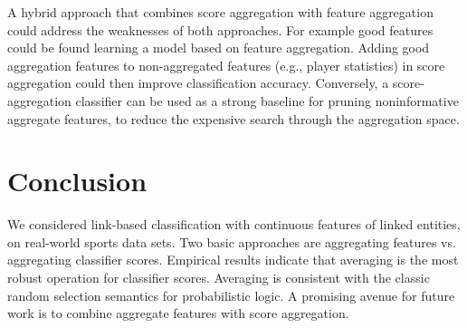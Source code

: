 \documentclass[oribibl]{llncs}%
\begin{document}
A hybrid approach that combines score aggregation with feature aggregation could address the weaknesses of both approaches. 
For example good features could be found learning a model based on feature aggregation. Adding  good aggregation features to non-aggregated features (e.g., player statistics) in score aggregation could then improve classification accuracy. Conversely, a score-aggregation classifier can be used as a strong baseline for pruning noninformative aggregate features, to reduce the expensive search through the aggregation space.


\section{Conclusion} We considered link-based classification with continuous features of linked entities, on real-world sports data sets. Two basic approaches are aggregating features vs. aggregating classifier scores. Empirical results indicate that averaging is the most robust operation for classifier scores. Averaging is consistent with the classic random selection semantics for probabilistic logic. A promising avenue for future work is to combine aggregate features with score aggregation. 




%


%

\end{document}
